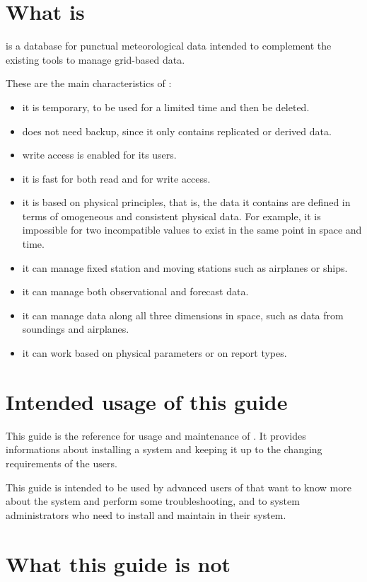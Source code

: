 \section{What is \dballe{} }

\dballe{} is a database for punctual meteorological data intended to complement
the existing tools to manage grid-based data.

These are the main characteristics of \dballe{}:

\begin{itemize}
\item it is temporary, to be used for a limited time and then be deleted.
\item does not need backup, since it only contains replicated or derived data.
\item write access is enabled for its users.
\item it is fast for both read and for write access.
\item it is based on physical principles, that is, the data it contains are
      defined in terms of omogeneous and consistent physical data.  For
      example, it is impossible for two incompatible values to exist in the
      same point in space and time.
\item it can manage fixed station and moving stations such as airplanes or
      ships.
\item it can manage both observational and forecast data.
\item it can manage data along all three dimensions in space, such as data from
      soundings and airplanes.
\item it can work based on physical parameters or on report types.
\end{itemize}


\section{Intended usage of this guide}

This guide is the reference for usage and maintenance of \dballe{}.  It
provides informations about installing a \dballe{} system and keeping it up to
the changing requirements of the users.

This guide is intended to be used by advanced users of \dballe{} that want to
know more about the system and perform some troubleshooting, and to system
administrators who need to install and maintain \dballe{} in their system.

\section{What this guide is not}

